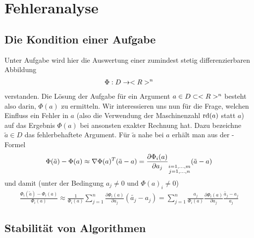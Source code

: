 \section{Fehleranalyse}

\subsection{Die Kondition einer Aufgabe}

Unter Aufgabe wird hier die Auswertung einer zumindest stetig differenzierbaren Abbildung
\begin{align}
	\Phi: D\to<R>^n\notag
\end{align}
verstanden. Die Lösung der Aufgabe für ein Argument $a\in D\subset<R>^n$ besteht also darin, $\Phi(a)$ zu ermitteln. Wir interessieren uns nun für die Frage, welchen Einfluss ein Fehler in $a$ (also die Verwendung der Maschinenzahl $\operatorname{rd}(a)$ statt $a$) auf das Ergebnis $\Phi(a)$ bei ansonsten exakter Rechnung hat. Dazu bezeichne $\tilde{a}\in D$ das fehlerbehaftete Argument. Für $\tilde{a}$ nahe bei $a$ erhält man aus der -Formel
\begin{align}
	\Phi(\tilde{a}) - \Phi(a) \approx\nabla\Phi(a)^T(\tilde{a}-a)= \frac{\partial \Phi_i(a)}{\partial a_j}_{\substack{i=1,...,m \\ j=1,...,n}} (\tilde{a}-a)\notag
\end{align}
und damit (unter der Bedingung $a_j\neq 0$ und $\Phi(a)_i\neq 0$)
\begin{align}
	\label{4.1}
	\frac{\Phi_i(\tilde{a}) - \Phi_i(a)}{\Phi_i(a)} \approx \frac{1}{\Phi_i(a)}\sum_{j=1}^{n}\frac{\partial \Phi_i(a)}{\partial a_j} (\tilde{a_j}-a_j) = \sum_{j=1}^n \frac{a_j}{\Phi_i(a)}\frac{\partial\Phi_i(a)}{\partial a_j}\frac{\tilde{a_j}-a_j}{a_j}
\end{align}

\subsection{Stabilität von Algorithmen}